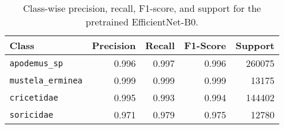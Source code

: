 \begin{table}[ht]
\centering
\caption{Class-wise precision, recall, F1-score, and support for the pretrained EfficientNet-B0.}
\label{tab:precision_recall_fscore_support}
\begin{tabular}{l r r r r}
\toprule
Class & Precision & Recall & F1-Score & Support \\
\midrule
\texttt{apodemus\_sp} & 0.996 & 0.997 & 0.996 & 260075 \\
\texttt{mustela\_erminea} & 0.999 & 0.999 & 0.999 & 13175 \\
\texttt{cricetidae} & 0.995 & 0.993 & 0.994 & 144402 \\
\texttt{soricidae} & 0.971 & 0.979 & 0.975 & 12780 \\
\bottomrule
\end{tabular}
\end{table}